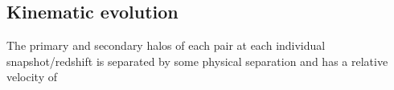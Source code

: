 \documentclass[twocolumn]{aastex631}
\begin{document}




\subsection{Kinematic evolution}\label{sec:results-kinematics}
The primary and secondary halos of each pair at each individual snapshot/redshift is separated by some physical separation and has a relative velocity of 
\end{document}
